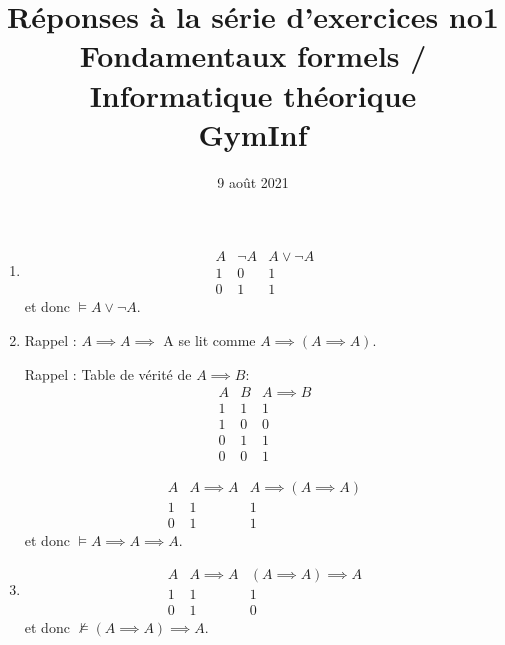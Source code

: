 \documentclass[12pt,french,a4paper]{article}
\begin{document}
\title{\vspace{-2cm}Réponses à la série d'exercices no1\\\large{Fondamentaux formels / Informatique théorique\\GymInf}}
\date{\vspace{-1cm}9 août 2021}

\maketitle
\begin{question}
\begin{enumerate}

\item \begin{displaymath}
\begin{array}{c|ccc}
A  & \neg A & A \vee \neg A\\
\hline
1 & 0 & 1\\
0 & 1 & 1
\end{array} 
\end{displaymath}
et donc $\vDash A \vee \neg A.$

\item Rappel : $A \implies A \implies$ A se lit comme $A \implies (A \implies A).$

Rappel : Table de vérité de $A \implies B$:
\begin{displaymath}
\begin{array}{cc|c}
A & B & A \implies B\\
\hline
1 & 1 & 1\\
1 & 0 & 0\\
0 & 1 & 1\\
0 & 0 & 1
\end{array}
\end{displaymath}

\begin{displaymath}
\begin{array}{c|ccc}
A  & A \implies A & A \implies (A \implies A)\\
\hline
1 & 1 & 1\\
0 & 1 & 1
\end{array} 
\end{displaymath}
et donc $\vDash A \implies A \implies A.$

\item \begin{displaymath}
\begin{array}{c|ccc}
A  & A \implies A & (A \implies A) \implies A\\
\hline
1 & 1 & 1\\
0 & 1 & 0
\end{array} 
\end{displaymath}
et donc $\not\vDash (A \implies A) \implies A.$


\end{enumerate}
\end{question}
\end{document}
